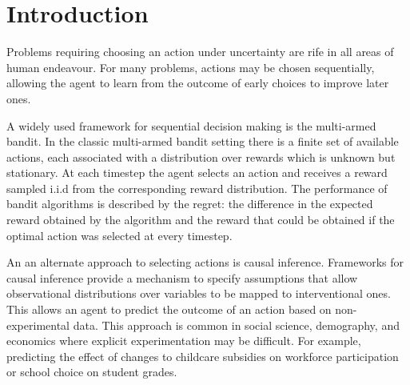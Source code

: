 \documentclass{article}
\theoremstyle{plain}
\theoremstyle{definition}
\begin{document}
 


\begin{abstract} 

\end{abstract} 

\section{Introduction}
Problems requiring choosing an action under uncertainty are rife in all areas of human endeavour. For many problems, actions may be chosen sequentially, allowing the agent to learn from the outcome of early choices to improve later ones. 

A widely used framework for sequential decision making is the multi-armed bandit. In the classic multi-armed bandit setting there is a finite set of available actions, each associated with a distribution over rewards which is unknown but stationary. At each timestep the agent selects an action and receives a reward sampled i.i.d from the corresponding reward distribution. The performance of bandit algorithms is described by the regret: the difference in the expected reward obtained by the algorithm and the reward that could be obtained if the optimal action was selected at every timestep. 

An an alternate approach to selecting actions is causal inference. Frameworks for causal inference provide a mechanism to specify assumptions that allow observational distributions over variables to be mapped to interventional ones. This allows an agent to predict the outcome of an action based on non-experimental data. This approach is common in social science, demography, and economics where explicit experimentation may be difficult. For example, predicting the effect of changes to childcare subsidies on workforce participation or school choice on student grades. 
\end{document}
